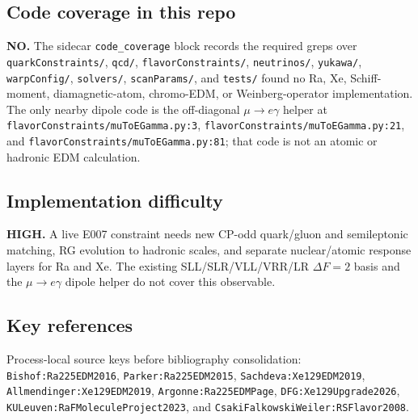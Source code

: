 \subsection*{Code coverage in this repo}
\textbf{NO.}  The sidecar \texttt{code\_coverage} block records the required
greps over \texttt{quarkConstraints/}, \texttt{qcd/},
\texttt{flavorConstraints/}, \texttt{neutrinos/}, \texttt{yukawa/},
\texttt{warpConfig/}, \texttt{solvers/}, \texttt{scanParams/}, and
\texttt{tests/} found no Ra, Xe, Schiff-moment, diamagnetic-atom, chromo-EDM,
or Weinberg-operator implementation.  The only nearby dipole code is the
off-diagonal \(\mu\to e\gamma\) helper at
\texttt{flavorConstraints/muToEGamma.py:3},
\texttt{flavorConstraints/muToEGamma.py:21}, and
\texttt{flavorConstraints/muToEGamma.py:81}; that code is not an atomic or
hadronic EDM calculation.

\subsection*{Implementation difficulty}
\textbf{HIGH.}  A live E007 constraint needs new CP-odd quark/gluon and
semileptonic matching, RG evolution to hadronic scales, and separate
nuclear/atomic response layers for Ra and Xe.  The existing
SLL/SLR/VLL/VRR/LR \(\Delta F=2\) basis and the \(\mu\to e\gamma\) dipole
helper do not cover this observable.

\subsection*{Key references}
Process-local source keys before bibliography consolidation:
\texttt{Bishof:Ra225EDM2016}, \texttt{Parker:Ra225EDM2015},
\texttt{Sachdeva:Xe129EDM2019}, \texttt{Allmendinger:Xe129EDM2019},
\texttt{Argonne:Ra225EDMPage}, \texttt{DFG:Xe129Upgrade2026},
\texttt{KULeuven:RaFMoleculeProject2023}, and
\texttt{CsakiFalkowskiWeiler:RSFlavor2008}.
